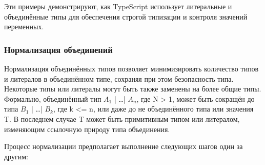 Эти примеры демонстрируют, как TypeScript использует литеральные и объединённые типы для обеспечения строгой типизации
и контроля значений переменных.

\subsubsection{Нормализация объединений}

Нормализация объединённых типов позволяет минимизировать количество типов и литералов в объединённом типе, сохраняя
при этом безопасность типа.
Некоторые типы или литералы могут быть также заменены на более общие типы.
Формально, объединённый тип $A_1$ | \ldots | $A_n$, где N > 1, может быть сокращён до типа $B_1$ | \ldots | $B_k$, где k <= n,
или даже до не объединённого типа или значения T\@.
В последнем случае T может быть примитивным типом или литералом, изменяющим ссылочную природу типа объединения.

Процесс нормализации предполагает выполнение следующих шагов один за другим:

